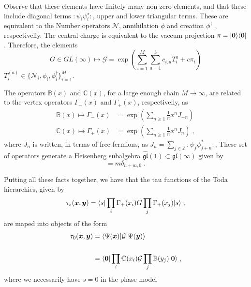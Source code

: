 \documentclass[a4paper,11pt]{amsart}
\begin{document}
Observe that these elements have finitely many non zero elements, and
that these include diagonal terms \(\bm{\colon} \psi_i
\psi_i^\star\bm{\colon}\), upper and lower triangular terms. These are
equivalent to the Number operators \(\mathcal{N}\), annihilation
\(\phi\) and creation \(\phi^\dagger\) , respectivelly.  The central
charge is equivalent to the vaccum projection \(\pi =
\lvert\bm{0}\rangle\langle\bm{0}\rvert\). Therefore, the elements
\begin{equation}
  G \in GL(\infty) \mapsto
  \mathcal{G} = \exp \left(\sum_{i=1}^M \sum_{a=1}^3  c_{i, a} T_i^{a}  + c \pi_i\right)
\end{equation}
\(T^{(a)}_i \in \{ \mathcal{N}_i, \phi_i, \phi_i^\dagger \}_{i=1}^M\). 

The operators \(\mathbb{B}(x)\) and \(\mathbb{C}(x)\), 
for a large enough chain \(M\to \infty\),
are related to the vertex operators
\(\Gamma_-(x)\) and \(\Gamma_+(x)\), respectivelly, as
\begin{equation}
  \begin{split}
    \mathbb{B}(x) \mapsto \Gamma_-(x) & = \exp \left( \sum_{n\geq 1} \frac{1}{n}x^n J_{-n}\right) \\
    \mathbb{C}(x) \mapsto \Gamma_+(x) & = \exp \left( \sum_{n\geq 1} \frac{1}{n}x^n J_{n}\right) \; ,
  \end{split}
\end{equation}
where \(J_n \) is written, in terms of free fermions, as \(J_n =
\sum_{j\in \mathbb{Z}} \bm{\colon} \psi_j \psi_{j+n}^\ast
\bm{\colon}\),
These set of operators generate a Heisenberg subalgebra
\(\widehat{\mathfrak{gl}}(1) \subset \mathfrak{gl}(\infty)\) given by
\begin{equation}
  [J_m, J_n] = m \delta_{n+m,0}\; .
\end{equation}

Putting all these facts together, we have that the tau functions of the Toda 
hierarchies, given by
\begin{equation}
  \tau_s(\bm{x}, \bm{y}) = \langle s\rvert \prod_{i} \Gamma_+(x_i) G \prod_j \Gamma_+(x_j) \lvert s\rangle\; ,
\end{equation}
are maped into objects of the form 
\begin{equation}
\begin{split}
  \tau_0(\bm{x}, \bm{y}) & = \langle\Psi(\bm{x})\rvert \mathcal{G} \lvert\Psi(\bm{y})\rangle \\
  \\ & = \langle\bm{0}\rvert \prod_{i} \mathbb{C}(x_i)
  \mathcal{G} \prod_j \mathbb{B}(y_j) \lvert\bm{0}\rangle\; ,
\end{split}
\end{equation}
where we necessarily have \(s=0\) in the phase model
\end{document}
